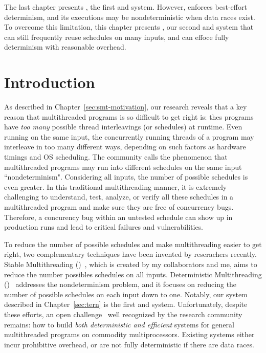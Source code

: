 The last chapter presents \tern, the first \smt and \dmt system. However, \tern
enforces best-effort determinism, and its executions may be nondeterministic
when data races exist. To overcome this limitation, this chapter presents
\peregrine, our second \smt and \dmt system that can still frequently reuse
schedules on many inputs, and can effoce fully determinism with reasonable
overhead.

\section{Introduction} \label{sec:peregrine-intro}

As described in Chapter~\ref{sec:smt-motivation}, our research reveals that a
key reason that multithreaded programs is so difficult to get right is: thes
programs have \emph{too many} possible thread interleavings (or schedules) at
runtime. Even running on the same input, the concurrently running threads of a
program may interleave in too many different ways, depending on such factors as
hardware timings and OS scheduling. The community calls the phenomenon that
multithreaded programs may run into different schedules on the same input
``nondeterminism". Considering all inputs, the number of possible schedules is
even greater. In this traditional multithreading manner, it is
extremely challenging to understand, test, analyze, or verify all these
schedules in a multithreaded program and make sure they are free of concurrency
bugs. Therefore, a concurency bug within an untested schedule can show up in
production runs and lead to critical failures and vulnerabilities.

To reduce the number of possible schedules and make multithreading easier to get
right, two complementary techniques have been invented by reserachers recently.
Stable Multithreading (\smt)~\cite{determinator:osdi10, cui:tern:osdi10}, which
is created by my collaborators and me, aims to reduce the number possibles
schedules on all inputs. Deterministic Multithreading
(\dmt)~\cite{dmp:asplos09,kendo:asplos09,coredet:asplos10,
dos:osdi10,grace:oopsla09} addresses the nondeterminism problem, and it focuses
on reducing the number of possible schedules on each input down to one. Notably,
our \tern system described in Chapter~\ref{sec:tern} is the first \smt and \dmt
system. Unfortunately, despite these efforts, an open challenge~\cite{wodet11}
well recognized by the research community remains: how to build \emph{both
deterministic and efficient} \dmt systems for general multithreaded programs on
commodity multiprocessors.  Existing \dmt systems either incur prohibitive
overhead, or are not fully deterministic if there are data races.

